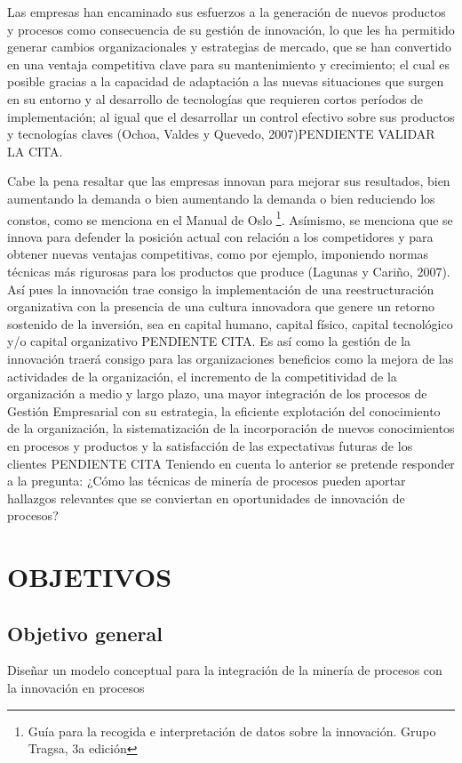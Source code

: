 \documentclass[a4paper, 11pt, titlepage]{article}
\begin{document}
Las empresas han encaminado sus esfuerzos a la generación de nuevos productos y procesos como consecuencia de su gestión de innovación, lo que les ha permitido generar cambios organizacionales y estrategias de mercado, que se han convertido en una ventaja competitiva clave para su mantenimiento y crecimiento; el cual es posible gracias a la capacidad de adaptación a las nuevas situaciones que surgen en su entorno y al desarrollo de tecnologías que requieren cortos períodos de implementación; al igual que el desarrollar un control efectivo sobre sus productos y tecnologías claves (Ochoa, Valdes y Quevedo, 2007)PENDIENTE VALIDAR LA CITA.

Cabe la pena resaltar que las empresas innovan para mejorar sus resultados, bien aumentando la demanda o bien aumentando la demanda o bien reduciendo los constos, como se menciona en el Manual de Oslo \footnote{Guía para la recogida e interpretación de datos sobre la innovación. Grupo Tragsa, 3a edición}. Asímismo, se menciona que se innova para defender la posición actual con relación a los competidores y para obtener nuevas ventajas competitivas, como por ejemplo, imponiendo normas técnicas más rigurosas para los productos que produce (Lagunas y Cariño, 2007). Así pues la innovación trae consigo la implementación de una reestructuración organizativa con la presencia de una cultura innovadora que genere un retorno sostenido de la inversión, sea en capital humano, capital físico, capital tecnológico y/o capital organizativo PENDIENTE CITA. Es así como la gestión de la innovación traerá consigo para las organizaciones beneficios como la mejora de las actividades de la organización, el incremento de la competitividad de la organización a medio y largo plazo, una mayor integración de los procesos de Gestión Empresarial con su estrategia, la eficiente explotación del conocimiento de la organización, la sistematización de la incorporación de nuevos conocimientos en procesos y productos y la satisfacción de
las expectativas futuras de los clientes PENDIENTE CITA Teniendo en cuenta lo anterior se pretende responder a la pregunta:
¿Cómo las técnicas de minería de procesos pueden aportar hallazgos relevantes que se
conviertan en oportunidades de innovación de procesos?

\newpage
\section{OBJETIVOS} \label{sec:introduction}
\subsection{Objetivo general}

Diseñar un modelo conceptual para la integración de la minería de procesos con la innovación en procesos















\newpage

{}
\end{document}
